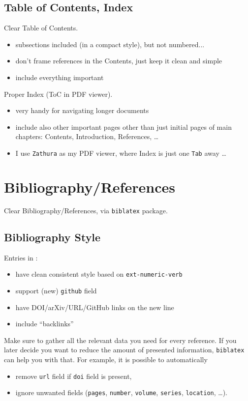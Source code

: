 \subsection{Table of Contents, Index}%
\label{sub:Table of Contents and Index}

Clear Table of Contents.
\begin{itemize}
    \item subsections included (in a compact style), but not numbered...
    \item don't frame references in the Contents, just keep it clean and simple
    \item include everything important
\end{itemize}

Proper Index (ToC in PDF viewer).
\begin{itemize}
    \item very handy for navigating longer documents
    \item include also other important pages other than just initial pages of main chapters: Contents, Introduction, References, \ldots
    \item I use \texttt{Zathura} as my PDF viewer, where Index is just one \texttt{Tab} away \ldots
\end{itemize}


\section{Bibliography/References}%
\label{sec:Bibliography/References}

Clear Bibliography/References, via \texttt{biblatex} package.

\subsection{Bibliography Style}%
\label{sub:Bibliography Style}

Entries in :
\begin{itemize}
    \item have clean consistent style based on \texttt{ext-numeric-verb}
    \item support (new) \texttt{github} field
    \item have DOI/arXiv/URL/GitHub links on the new line
    \item include \enquote{backlinks}
\end{itemize}

\begin{remark}
    Make sure to gather all the relevant data you need for every reference.
    If you later decide you want to reduce the amount of presented information, \texttt{biblatex} can help you with that.
    For example, it is possible to automatically
    \begin{itemize}
        \item remove \texttt{url} field if \texttt{doi} field is present,
        \item ignore unwanted fields (\texttt{pages}, \texttt{number}, \texttt{volume}, \texttt{series}, \texttt{location}, \ldots). \qedhere*
    \end{itemize}
\end{remark}

